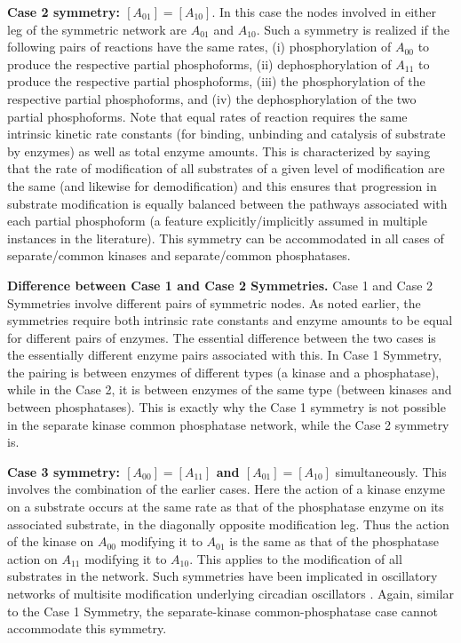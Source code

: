 \documentclass[9pt,lineno]{elife}
\begin{document}
{\bf Case 2 symmetry: $[A_{01}]=[A_{10}]$}. In this case the nodes involved in either leg of the symmetric network are $A_{01}$ and $A_{10}$. Such a symmetry is realized if the following pairs of reactions have the same rates, (i) phosphorylation of $A_{00}$ to produce the respective partial phosphoforms, (ii) dephosphorylation of $A_{11}$ to produce the respective partial phosphoforms, (iii) the phosphorylation of the respective partial phosphoforms, and (iv) the dephosphorylation of the two partial phosphoforms.
Note that equal rates of reaction requires the same intrinsic kinetic rate constants (for binding, unbinding and catalysis of substrate by enzymes) as well as total enzyme amounts.
This is characterized by saying that  the  rate of modification of all substrates of a given level of modification are the same (and likewise for demodification) and this ensures that progression in substrate modification is equally balanced between the pathways associated with each partial phosphoform (a feature explicitly/implicitly assumed in multiple
instances in the literature). This symmetry can be accommodated in all cases of separate/common kinases and separate/common phosphatases.

{\bf Difference between Case 1 and Case 2 Symmetries.} Case 1 and Case 2 Symmetries involve different pairs of symmetric nodes. As noted earlier, the symmetries require both intrinsic rate constants and enzyme amounts to be equal for different pairs of enzymes. The essential difference between the two cases is the essentially different enzyme pairs associated with this. In Case 1 Symmetry, the pairing is between enzymes of different types (a kinase and a phosphatase), while in the Case 2, it is between enzymes of the same type (between kinases and between phosphatases).
This is exactly why the Case 1 symmetry is not possible in the separate kinase common phosphatase network, while the Case 2 symmetry is.

{\bf Case 3 symmetry: $[A_{00}]=[A_{11}]$ and $[A_{01}]=[A_{10}]$} simultaneously. This involves the combination of the earlier cases. Here the action of a kinase enzyme on a substrate occurs at the same rate as that of the phosphatase enzyme on its associated substrate, in the diagonally opposite modification leg. Thus the action of the kinase on $A_{00}$ modifying it to $A_{01}$ is the same as that of the phosphatase action on $A_{11}$ modifying it to $A_{10}$. This applies to the modification  of all substrates in the network. Such symmetries have been implicated in oscillatory networks of
multisite modification underlying circadian oscillators \cite{Jolley2012}.
Again, similar to the Case 1 Symmetry, the separate-kinase 
common-phosphatase case cannot accommodate this symmetry.
\end{document}
